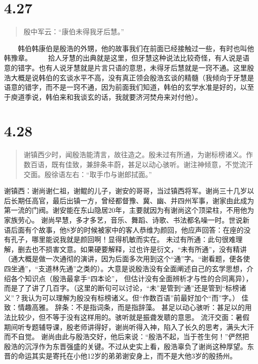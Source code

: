 \documentclass[]{book}
\begin{document}
\section{4.27}\label{section-205}

\begin{quote}
殷中军云：``康伯未得我牙后慧。''
\end{quote}

　　韩伯韩康伯是殷浩的外甥，他的故事我们在前面已经接触过一些，有时也叫他韩豫章。
　　拾人牙慧的出典就是这里，但牙慧这种说法比较奇怪，有人说是语意的错字。也有人说牙慧就是片言只语的意思，未得牙后慧就是一窍不通。这里殷浩大概是说韩伯的玄谈水平不高，没有真正领会殷浩玄谈的精髓（我倾向于牙慧是语意的错字，而不是一窍不通，因为前面我们知道，韩伯的玄学水准是好的，以至于庾道季说，韩伯来和我谈玄的话，我就要济河焚舟来对付他）。

\section{4.28}\label{section-206}

\begin{quote}
谢镇西少时，闻殷浩能清言，故往造之。殷未过有所通，为谢标榜诸义。作数百语，既有佳致，兼辞条丰蔚，甚足以动心骇听。谢注神倾意，不觉流汗交面。殷徐语左右：``取手巾与谢郎拭面。''
\end{quote}

谢镇西：谢尚谢仁祖，谢鲲的儿子，谢安的哥哥，当过镇西将军。谢尚三十几岁以后长期任高官，最后出镇一方，曾经都督豫、冀、幽、并四州军事，谢家由此成为第一流的门阀。谢安能在东山隐居20年，主要就因为有谢尚这个顶梁柱，不用他为家族劳心。
谢尚早慧，多才多艺，音乐、舞蹈、诗歌、书法都名噪一时。世说新语后面有个故事，他8岁的时候被家中的客人恭维为颜回，他应声回答：在座的没有孔子，哪里能说我就是颜回啊！显得机敏而实在。
未过有所通：此句很难理解，删去也不损害文意。如果硬要解释，过也许是衍文，``未有所通''，没有精讲（通大概是做一次通彻的演讲，因为后面多次用到这个``通''字。``谢看题，便各使四坐通''，``支道林先通''之类的）。大意是说殷浩没有全面阐述自己的玄学思想，介绍各个知识点（殷浩最拿手``四本论''，
但估计没有全面辨析才与性的合同离异），而是了了讲了几百字。（这里的断句可以讨论，``未''是管到``通''还是管到``标榜诸义''？我认为可以理解为殷没有标榜诸义。但``作数百语''前最好加个``而''字。）
佳致：情趣高雅。 辞条：不是指词条，而是指辞藻。
甚足以动心骇听：甚足以的用法比较少，但不等于没有这样用的。骇听就是振聋发聩的意思。
流汗交面：暑假期间听专题辅导课，殷老师讲得好，谢尚听得入神，陷入了长久的思考，满头大汗而不自觉。
谢尚由此与殷浩交好，他后来说：``殷浩不起，当于苍生何！''俨然把殷浩的沉浮作为东晋强盛的关键。不过从史实上看，殷浩辜负了谢尚这种厚望。东晋的命运其实是寄托在小他12岁的弟弟谢安身上，而不是大他3岁的殷扬州。
\end{document}
